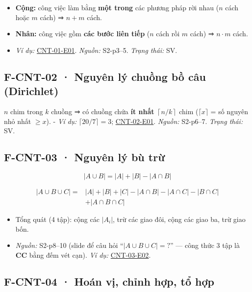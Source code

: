 \documentclass[
  10pt,
  twoside,openany]{book}
\providecommand{\tightlist}{%
  \setlength{\itemsep}{0pt}\setlength{\parskip}{0pt}}
\begin{document}
\begin{itemize}
\tightlist
\item
  \textbf{Cộng:} công việc làm bằng \textbf{một trong} các phương pháp
  rời nhau (\(n\) cách hoặc \(m\) cách) ⇒ \(n+m\) cách.
\item
  \textbf{Nhân:} công việc gồm \textbf{các bước liên tiếp} (\(n\) cách
  rồi \(m\) cách) ⇒ \(n\cdot m\) cách.
\item
  \emph{Ví dụ:} \protect\hyperlink{CNT-01-E01}{CNT-01-E01}.
  \emph{Nguồn:} S2-p3--5. \emph{Trạng thái:} SV.
\end{itemize}

\hypertarget{F-CNT-02}{%
\subsection{F-CNT-02 · Nguyên lý chuồng bồ câu
(Dirichlet)}\label{F-CNT-02}}

\(n\) chim trong \(k\) chuồng ⇒ có chuồng chứa \textbf{ít nhất}
\(\left\lceil n/k\right\rceil\) chim (\(\lceil x\rceil\) = số nguyên nhỏ
nhất \(\ge x\)). - \emph{Ví dụ:} \(\lceil 20/7\rceil=3\);
\protect\hyperlink{CNT-02-E01}{CNT-02-E01}. \emph{Nguồn:} S2-p6--7.
\emph{Trạng thái:} SV.

\hypertarget{F-CNT-03}{%
\subsection{F-CNT-03 · Nguyên lý bù trừ}\label{F-CNT-03}}

\[
\lvert A\cup B\rvert=\lvert A\rvert+\lvert B\rvert-\lvert A\cap B\rvert
\]

\[
\begin{aligned}
\lvert A\cup B\cup C\rvert={}&\lvert A\rvert+\lvert B\rvert+\lvert C\rvert-\lvert A\cap B\rvert-\lvert A\cap C\rvert-\lvert B\cap C\rvert\\
&+\lvert A\cap B\cap C\rvert
\end{aligned}
\]

\begin{itemize}
\tightlist
\item
  Tổng quát (4 tập): cộng các \(|A_i|\), trừ các giao đôi, cộng các giao
  ba, trừ giao bốn.
\item
  \emph{Nguồn:} S2-p8--10 (slide để câu hỏi ``\(|A\cup B\cup C|=?\)''
  --- công thức 3 tập là \textbf{CC} bằng đếm vét cạn). \emph{Ví dụ:}
  \protect\hyperlink{CNT-03-E02}{CNT-03-E02}.
\end{itemize}

\hypertarget{F-CNT-04}{%
\subsection{F-CNT-04 · Hoán vị, chỉnh hợp, tổ hợp}\label{F-CNT-04}}
\end{document}
